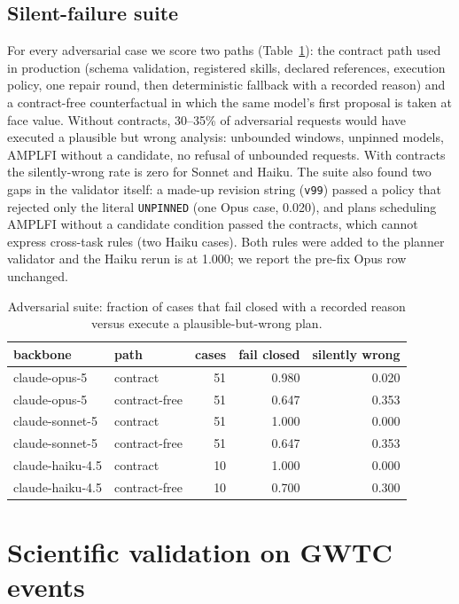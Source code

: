 \documentclass[twocolumn]{aastex631}
\begin{document}
\subsection{Silent-failure suite}
For every adversarial case we score two paths (Table~\ref{tab:guardrails}):
the contract path used in production (schema validation, registered
skills, declared references, execution policy, one repair round, then
deterministic fallback with a recorded reason) and a contract-free
counterfactual in which the same model's first proposal is taken at face
value. Without contracts, 30--35\% of adversarial requests would have
executed a plausible but wrong analysis: unbounded windows, unpinned
models, AMPLFI without a candidate, no refusal of unbounded requests. With
contracts the silently-wrong rate is zero for Sonnet and Haiku. The suite
also found two gaps in the validator itself: a made-up revision string
(\texttt{v99}) passed a policy that rejected only the literal
\texttt{UNPINNED} (one Opus case, 0.020), and plans scheduling AMPLFI
without a candidate condition passed the contracts, which cannot express
cross-task rules (two Haiku cases). Both rules were added to the planner
validator and the Haiku rerun is at 1.000; we report the pre-fix Opus row
unchanged.

\begin{table}
\centering
\caption{Adversarial suite: fraction of cases that fail closed with a
recorded reason versus execute a plausible-but-wrong plan.}
\label{tab:guardrails}
\begin{tabular}{llrrr}
\toprule
backbone & path & cases & fail closed & silently wrong \\
\midrule
claude-opus-5 & contract & 51 & 0.980 & 0.020 \\
claude-opus-5 & contract-free & 51 & 0.647 & 0.353 \\
claude-sonnet-5 & contract & 51 & 1.000 & 0.000 \\
claude-sonnet-5 & contract-free & 51 & 0.647 & 0.353 \\
claude-haiku-4.5 & contract & 10 & 1.000 & 0.000 \\
claude-haiku-4.5 & contract-free & 10 & 0.700 & 0.300 \\
\bottomrule
\end{tabular}
\end{table}

\section{Scientific validation on GWTC events}
\label{sec:population}
\end{document}

